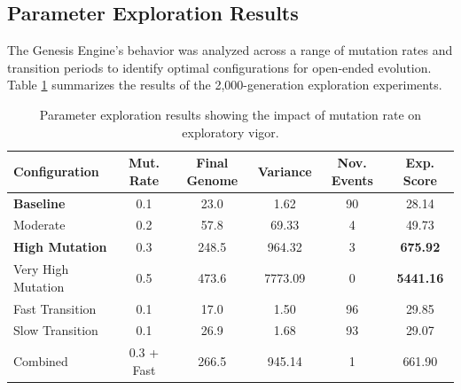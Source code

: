 \begin{table}[h]
\centering
{}
\caption{Comparison of evolutionary dynamics across baseline methods.}
\label{tab:baseline_comparison}
\end{table}

\subsection{Parameter Exploration Results}
\label{sec:param_exploration}

The Genesis Engine's behavior was analyzed across a range of mutation rates and transition periods to identify optimal configurations for open-ended evolution. Table \ref{tab:param_exploration} summarizes the results of the 2,000-generation exploration experiments.

\begin{table}[h]
\centering
\small
\begin{tabular}{lccccc}
\toprule
\textbf{Configuration} & \textbf{Mut. Rate} & \textbf{Final Genome} & \textbf{Variance} & \textbf{Nov. Events} & \textbf{Exp. Score} \\
\midrule
\textbf{Baseline} & 0.1 & 23.0 & 1.62 & 90 & 28.14 \\
Moderate & 0.2 & 57.8 & 69.33 & 4 & 49.73 \\
\textbf{High Mutation} & 0.3 & 248.5 & 964.32 & 3 & \textbf{675.92} \\
Very High Mutation & 0.5 & 473.6 & 7773.09 & 0 & \textbf{5441.16} \\
Fast Transition & 0.1 & 17.0 & 1.50 & 96 & 29.85 \\
Slow Transition & 0.1 & 26.9 & 1.68 & 93 & 29.07 \\
Combined & 0.3 + Fast & 266.5 & 945.14 & 1 & 661.90 \\
\bottomrule
\end{tabular}
\caption{Parameter exploration results showing the impact of mutation rate on exploratory vigor.}
\label{tab:param_exploration}
\end{table}

